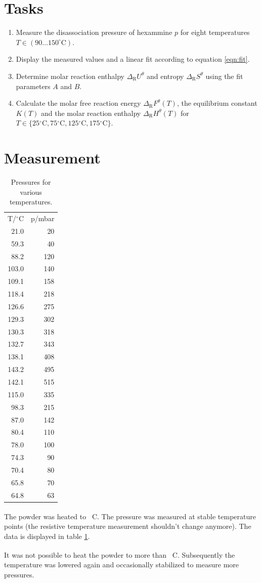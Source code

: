 \documentclass[english,twocolumn,DIV21,a4,10pt]{scrartcl}
\newcommand{\dr}{\Delta_\textrm{R}}
\newcommand{\dc}{{}^\circ\textrm{C}}
\begin{document}
\section{Tasks}
\begin{enumerate}
\item Measure the disassociation pressure of hexammine $p$ for eight
  temperatures $T\in (90\ldots150^\circ\textrm{C})$.
\item Display the measured values and a linear fit according to
  equation \eqref{eqn:fit}.
\item Determine molar reaction enthalpy $\dr U^\theta$ and entropy
  $\dr S^\theta$ using the fit parameters $A$ and $B$.
\item Calculate the molar free reaction energy $\dr F^\theta(T)$, the
  equilibrium constant $K(T)$ and the molar reaction enthalpy $\dr
  H^\theta(T)$ for $T\in\{25\dc,75\dc,125\dc,175\dc\}$.
\end{enumerate}

\section{Measurement}

  \begin{table}[htbp]
    \centering
    \begin{tabular}{rr}
 T/${}^\circ\textrm{C}$ & p/mbar\\
  21.0 &  20 \\
  59.3 &  40 \\
  88.2 & 120 \\
 103.0 & 140 \\
 109.1 & 158 \\
 118.4 & 218 \\
 126.6 & 275 \\
 129.3 & 302 \\
 130.3 & 318 \\
 132.7 & 343 \\
 138.1 & 408 \\
 143.2 & 495 \\
 142.1 & 515 \\
 115.0 & 335 \\
  98.3 & 215 \\
  87.0 & 142 \\
  80.4 & 110 \\
  78.0 & 100 \\
  74.3 &  90 \\
  70.4 &  80 \\
  65.8 &  70 \\
  64.8 &  63 \\
    \end{tabular}
    \caption{Pressures for various temperatures.}
    \label{tab:meas}
  \end{table}
  The powder was heated to \unit[140]{{}^\circ\textrm{C}}.  The
  pressure was measured at stable temperature points (the resistive
  temperature measurement shouldn't change anymore). The data is
  displayed in table \ref{tab:meas}.

  It was not possible to heat the powder to more than
  \unit[145]{{}^\circ\textrm{C}}. Subsequently the temperature was
  lowered again and occasionally stabilized to measure more pressures.

  
 
\end{document}
